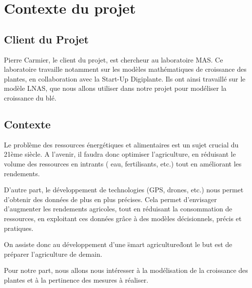 \section{Contexte du projet}

\subsection{Client du Projet}
Pierre Carmier, le client du projet, est chercheur au laboratoire MAS. Ce laboratoire travaille notamment sur les modèles mathématiques de croissance des plantes, en collaboration avec la Start-Up Digiplante. Ils ont ainsi travaillé sur le modèle LNAS, que nous allons utiliser dans notre projet pour modéliser la croissance du blé.
\subsection{Contexte}
Le problème des ressources énergétiques et alimentaires est un sujet crucial du  21ème siècle.
A l'avenir, il faudra donc optimiser l'agriculture, en réduisant le volume des ressources en intrants ( eau, fertilisants, etc.) tout en améliorant les rendements.

D'autre part, le développement de technologies (GPS, drones, etc.) nous permet d'obtenir des données de plus en plus précises. 
Cela permet d'envisager d'augmenter les rendements agricoles, tout en réduisant la consommation de ressources, en exploitant ces données grâce à des modèles décisionnels, précis et pratiques. 

On assiste donc au développement d'une \"smart agriculture\" dont le but est de préparer
l'agriculture de demain.

Pour notre part, nous allons nous intéresser à la modélisation de la croissance des plantes et à la pertinence des mesures à réaliser.
